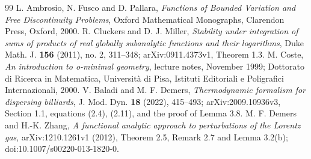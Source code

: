 \begin{thebibliography}{99}
 L. Ambrosio, N. Fusco and D. Pallara,
\emph{Functions of Bounded Variation and Free Discontinuity Problems},
Oxford Mathematical Monographs, Clarendon Press, Oxford, 2000.
 R. Cluckers and D. J. Miller,
\emph{Stability under integration of sums of products of real globally
subanalytic functions and their logarithms}, Duke Math. J.
\textbf{156} (2011), no. 2, 311--348; arXiv:0911.4373v1,
Theorem 1.3.
 M. Coste, \emph{An introduction to o-minimal geometry},
lecture notes, November 1999; Dottorato di Ricerca in Matematica,
Universit\`a di Pisa, Istituti Editoriali e Poligrafici Internazionali, 2000.
 V. Baladi and M. F. Demers,
\emph{Thermodynamic formalism for dispersing billiards},
J. Mod. Dyn. \textbf{18} (2022), 415--493;
arXiv:2009.10936v3, Section 1.1, equations (2.4), (2.11), and the proof of Lemma 3.8.
 M. F. Demers and H.-K. Zhang,
\emph{A functional analytic approach to perturbations of the Lorentz gas},
arXiv:1210.1261v1 (2012), Theorem 2.5, Remark 2.7 and Lemma 3.2(b);
doi:10.1007/s00220-013-1820-0.
\end{thebibliography}
